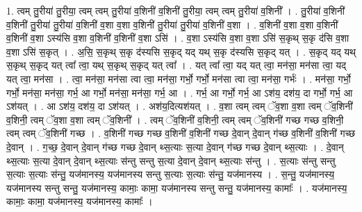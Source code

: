 \documentclass[17pt]{extarticle}
\begin{document}
1. त्वम् तु॒रीया॑ तु॒रीया॒ त्वम् त्वम् तु॒रीया॑ व॒शिनी॑ व॒शिनी॑ तु॒रीया॒ त्वम् त्वम् तु॒रीया॑ व॒शिनी᳚ । . तु॒रीया॑ व॒शिनी॑ व॒शिनी॑ तु॒रीया॑ तु॒रीया॑ व॒शिनी॑ व॒शा व॒शा व॒शिनी॑ तु॒रीया॑ तु॒रीया॑ व॒शिनी॑ व॒शा । . व॒शिनी॑ व॒शा व॒शा व॒शिनी॑ व॒शिनी॑ व॒शा ऽस्य॑सि व॒शा व॒शिनी॑ व॒शिनी॑ व॒शा ऽसि॑ । . व॒शा ऽस्य॑सि व॒शा व॒शा ऽसि॑ स॒कृथ् स॒कृ द॑सि व॒शा व॒शा ऽसि॑ स॒कृत् । . अ॒सि॒ स॒कृथ् स॒कृ द॑स्यसि स॒कृद् यद् यथ् स॒कृ द॑स्यसि स॒कृद् यत् । . स॒कृद् यद् यथ् स॒कृथ् स॒कृद् यत् त्वा᳚ त्वा॒ यथ् स॒कृथ् स॒कृद् यत् त्वा᳚ । . यत् त्वा᳚ त्वा॒ यद् यत् त्वा॒ मन॑सा॒ मन॑सा त्वा॒ यद् यत् त्वा॒ मन॑सा । . त्वा॒ मन॑सा॒ मन॑सा त्वा त्वा॒ मन॑सा॒ गर्भो॒ गर्भो॒ मन॑सा त्वा त्वा॒ मन॑सा॒ गर्भः॑ । . मन॑सा॒ गर्भो॒ गर्भो॒ मन॑सा॒ मन॑सा॒ गर्भ॒ आ गर्भो॒ मन॑सा॒ मन॑सा॒ गर्भ॒ आ । . गर्भ॒ आ गर्भो॒ गर्भ॒ आ ऽश॑य॒ दश॑य॒ दा गर्भो॒ गर्भ॒ आ ऽश॑यत् । . आ ऽश॑य॒ दश॑य॒ दा ऽश॑यत् । . अश॑य॒दित्यश॑यत् । . व॒शा त्वम् त्वम् ॅव॒शा व॒शा त्वम् ॅव॒शिनी॑ व॒शिनी॒ त्वम् ॅव॒शा व॒शा त्वम् ॅव॒शिनी᳚ । . त्वम् ॅव॒शिनी॑ व॒शिनी॒ त्वम् त्वम् ॅव॒शिनी॑ गच्छ गच्छ व॒शिनी॒ त्वम् त्वम् ॅव॒शिनी॑ गच्छ । . व॒शिनी॑ गच्छ गच्छ व॒शिनी॑ व॒शिनी॑ गच्छ दे॒वान् दे॒वान् ग॑च्छ व॒शिनी॑ व॒शिनी॑ गच्छ दे॒वान् । . ग॒च्छ॒ दे॒वान् दे॒वान् ग॑च्छ गच्छ दे॒वान् थ्स॒त्याः स॒त्या दे॒वान् ग॑च्छ गच्छ दे॒वान् थ्स॒त्याः । . दे॒वान् थ्स॒त्याः स॒त्या दे॒वान् दे॒वान् थ्स॒त्याः स॑न्तु सन्तु स॒त्या दे॒वान् दे॒वान् थ्स॒त्याः स॑न्तु । . स॒त्याः स॑न्तु सन्तु स॒त्याः स॒त्याः स॑न्तु॒ यज॑मानस्य॒ यज॑मानस्य सन्तु स॒त्याः स॒त्याः स॑न्तु॒ यज॑मानस्य । . स॒न्तु॒ यज॑मानस्य॒ यज॑मानस्य सन्तु सन्तु॒ यज॑मानस्य॒ कामाः॒ कामा॒ यज॑मानस्य सन्तु सन्तु॒ यज॑मानस्य॒ कामाः᳚ । . यज॑मानस्य॒ कामाः॒ कामा॒ यज॑मानस्य॒ यज॑मानस्य॒ कामाः᳚ । \newline
\end{document}

